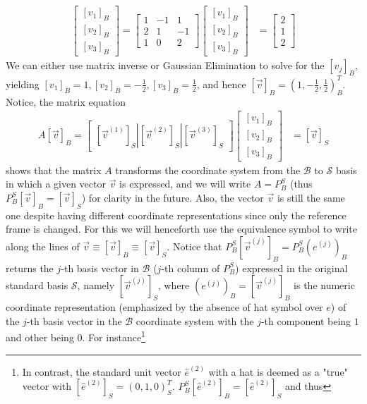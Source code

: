 \begin{solution}
\begin{align*}
\begin{bmatrix}
[v_1]_B \\
[v_2]_B \\
[v_3]_B
\end{bmatrix}
= 
\begin{bmatrix}
1 & -1 & 1 \\
2 & 1 & -1 \\
1 & 0 & 2
\end{bmatrix}
\begin{bmatrix}
[v_1]_B \\
[v_2]_B \\
[v_3]_B
\end{bmatrix}
&=
\begin{bmatrix}
2 \\
1 \\
2
\end{bmatrix}
\end{align*}
We can either use matrix inverse or Gaussian Elimination to solve for the $[v_j]_B$, yielding $[v_1]_B = 1, [v_2]_B = -\frac{1}{2}, [v_3]_B = \frac{1}{2}$, and hence $[\vec{v}]_B = (1, -\frac{1}{2}, \frac{1}{2})^T_B$. Notice, the matrix equation
\begin{align*}
A[\vec{v}]_B = \begin{bmatrix}[\vec{v}^{(1)}]_S|[\vec{v}^{(2)}]_S|[\vec{v}^{(3)}]_S
\end{bmatrix}\begin{bmatrix}
[v_1]_B \\
[v_2]_B \\
[v_3]_B
\end{bmatrix}
&= [\vec{v}]_S
\end{align*}
shows that the matrix $A$ transforms the coordinate system from the $\mathcal{B}$ to $\mathcal{S}$ basis in which a given vector $\vec{v}$ is expressed, and we will write $A = P_B^S$ (thus $P_B^S [\vec{v}]_B = [\vec{v}]_S$) for clarity in the future. Also, the vector $\vec{v}$ is still the same one despite having different coordinate representations since only the reference frame is changed. For this we will henceforth use the equivalence symbol to write along the lines of $\vec{v} \equiv [\vec{v}]_B \equiv [\vec{v}]_S$. Notice that $P_B^S[\vec{v}^{(j)}]_B = P_B^S (e^{(j)})_B$ returns the $j$-th basis vector in $\mathcal{B}$ ($j$-th column of $P_B^S$) expressed in the original standard basis $\mathcal{S}$, namely $[\vec{v}^{(j)}]_S$, where $(e^{(j)})_B = [\vec{v}^{(j)}]_B$ is the numeric coordinate representation (emphasized by the absence of hat symbol over $e$) of the $j$-th basis vector in the $\mathcal{B}$ coordinate system with the $j$-th component being $1$ and other being $0$. For instance\footnote{In contrast, the standard unit vector $\hat{e}^{(2)}$ with a hat is deemed as a "true" vector with $[\hat{e}^{(2)}]_S = (0,1,0)_S^T$. $P_B^S[\hat{e}^{(2)}]_B = [\hat{e}^{(2)}]_S$ and thus
}
\end{solution}
